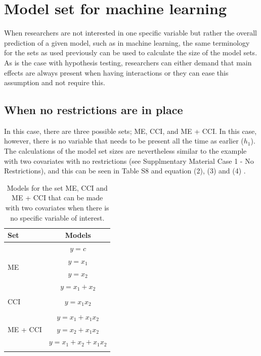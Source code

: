 




\section{Model set for machine learning}
When researchers are not interested in one specific variable but rather the overall prediction of a given model, such as in machine learning, the same terminology for the sets as used previously can be used to calculate the size of the model sets. 
As is the case with hypothesis testing, researchers can either demand that main effects are always present when having interactions or they can ease this assumption and not require this. \\

\subsection{When no restrictions are in place}
In this case, there are three possible sets; ME, CCI, and ME + CCI. In this case, however, there is no variable that needs to be present all the time as earlier ($h_1$). The calculations of the model set sizes are nevertheless similar to the example with two covariates with no restrictions (see Supplmentary Material Case 1 - No Restrictions), and this can be seen in Table S8 and equation (2), (3) and (4) .  

\begin{table}
\caption{Models for the set ME, CCI and ME + CCI that can be made with two covariates when there is no specific variable of interest.}
\centering
\begin{tabular}{lc} 
\toprule
Set & Models \\ 
\midrule
\multirow{4}{*}{ME} & $y=c$\\ & $y=x_1$\\ & $y=x_2$\\ & $y=x_1+x_2$\\ &  \\  
\multirow{1}{*}{CCI} & $y=x_1x_2$\\  & \\ 
\multirow{3}{*}{ME + CCI}  & $y=x_1 + x_1x_2$\\ & $y=x_2 + x_1x_2$\\ & $y=x_1+x_2 + x_1x_2$\\ &  \\  
\bottomrule
\end{tabular}
\end{table}

